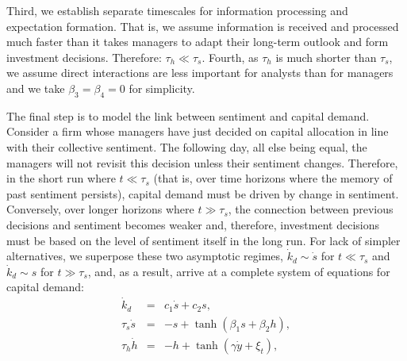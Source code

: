 \documentclass[authoryear, review]{elsarticle}
\begin{document}
Third, we establish separate timescales for information processing and expectation formation. That is, we assume information is received and processed much faster than it takes managers to adapt their long-term outlook and form investment decisions. Therefore: $\tau_h\ll\tau_s$. Fourth, as $\tau_h$ is much shorter than $\tau_s$, we assume direct interactions are less important for analysts than for managers and we take $\beta_3=\beta_4=0$ for simplicity.

The final step is to model the link between sentiment and capital demand. Consider a firm whose managers have just decided on capital allocation in line with their collective sentiment. The following day, all else being equal, the managers will not revisit this decision unless their sentiment changes. Therefore, in the short run where $t\ll\tau_s$ (that is, over time horizons where the memory of past sentiment persists), capital demand must be driven by change in sentiment. Conversely, over longer horizons where $t\gg\tau_s$, the connection between previous decisions and sentiment becomes weaker and, therefore, investment decisions must be based on the level of sentiment itself in the long run. For lack of simpler alternatives, we superpose these two asymptotic regimes, $\dot{k}_d\sim\dot{s}$ for $t\ll\tau_s$ and $\dot{k}_d\sim s$ for $t\gg\tau_s$, and, as a result, arrive at a complete system of equations for capital demand:
\begin{eqnarray}\label{eq_demand_sys}
    \dot{k}_d &=& c_1\dot{s} + c_2 s \label{eq_demand_kd},\\
    \tau_s\dot{s} &=& -s + \tanh\left(\beta_1 s + \beta_2 h\right), \label{eq_demand_s}\\
    \tau_h\dot{h} &=& -h + \tanh\left(\gamma\dot{y} + \xi_t\right),\label{eq_demand_h}
\end{eqnarray}
\end{document}
